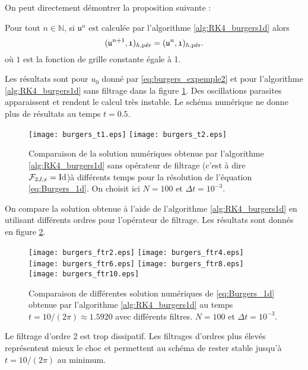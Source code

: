 On peut directement démontrer la proposition suivante :
\begin{proposition}
Pour tout $n \in \mathbb{N}$, si $\mathfrak{u}^n$ est calculée par l'algorithme \ref{alg:RK4_burgers1d} alors
\begin{equation}
(\mathfrak{u}^{n+1}, \mathfrak{1})_{h,\per} = (\mathfrak{u}^n, \mathfrak{1})_{h,\per}.
\end{equation}
où $\mathfrak{1}$ est la fonction de grille constante égale à 1.
\end{proposition}

Les résultats sont pour $u_0$ donné par \eqref{eq:burgers_expemple2} et pour l'algorithme \ref{alg:RK4_burgers1d} sans filtrage dans la figure \ref{fig:comp_burgers}. Des oscillations parasites apparaissent et rendent le calcul très instable. Le schéma numérique ne donne plus de résultats au temps $t=0.5$.

\begin{figure}[htbp]
\begin{center}
\texttt{[image: burgers\_t1.eps]}
\texttt{[image: burgers\_t2.eps]}
\end{center}
\caption{Comparaison de la solution numériques obtenue par l'algorithme \ref{alg:RK4_burgers1d} sans opérateur de filtrage (c'est à dire $\mathcal{F}_{2J,x} = \Id$)à différents temps pour la résolution de l'équation \eqref{eq:Burgers_1d}. On choisit ici $N=100$ et $\Delta t = 10^{-3}$.}
\label{fig:comp_burgers}
\end{figure}

On compare la solution obtenue à l'aide de l'algorithme \ref{alg:RK4_burgers1d} en utilisant différents ordres pour l'opérateur de filtrage. Les résultats sont donnés en figure \ref{fig:comp_burgers_ftr}.

\begin{figure}[htbp]
\begin{center}
\texttt{[image: burgers\_ftr2.eps]}
\texttt{[image: burgers\_ftr4.eps]}\\
\texttt{[image: burgers\_ftr6.eps]}
\texttt{[image: burgers\_ftr8.eps]}\\
\texttt{[image: burgers\_ftr10.eps]}
\end{center}
\caption{Comparaison de différentes solution numériques de \eqref{eq:Burgers_1d} obtenue par l'algorithme \ref{alg:RK4_burgers1d} au temps $t=10/(2 \pi) \approx 1.5920$ avec différents filtres. $N=100$ et $\Delta t = 10^{-3}$.}
\label{fig:comp_burgers_ftr}
\end{figure}

Le filtrage d'ordre 2 est trop dissipatif. Les filtrages d'ordres plus élevés représentent mieux le choc et permettent au schéma de rester stable jusqu'à $t=10/(2 \pi)$ au minimum.

































